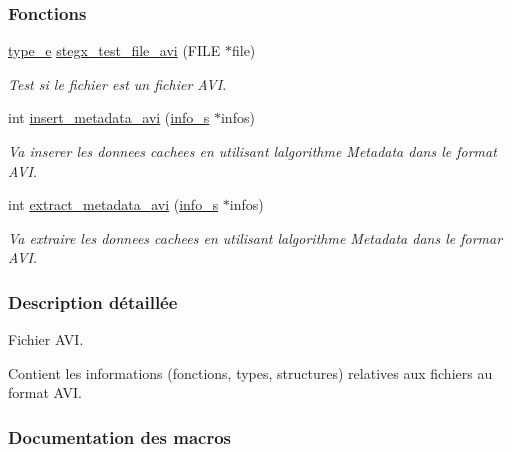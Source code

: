 \subsubsection*{Fonctions}
\begin{DoxyCompactItemize}
\item 
\hyperlink{a00047_af1ca434cca36ba9fb2a45f6cef3a16d6}{type\+\_\+e} \hyperlink{a00068_a219859c3514ef04eb40cb27845b208b0}{stegx\+\_\+test\+\_\+file\+\_\+avi} (F\+I\+LE $\ast$file)
\begin{DoxyCompactList}\small\item\em Test si le fichier est un fichier A\+VI. \end{DoxyCompactList}\item 
int \hyperlink{a00068_ac4b663dd386f05a601c55cd34b99cca4}{insert\+\_\+metadata\+\_\+avi} (\hyperlink{a00008_aa8ca908d92fb5bdd3c0a9e1f58b2cf03}{info\+\_\+s} $\ast$infos)
\begin{DoxyCompactList}\small\item\em Va inserer les donnees cachees en utilisant l\textquotesingle{}algorithme Metadata dans le format A\+VI. \end{DoxyCompactList}\item 
int \hyperlink{a00068_aa0a2b469d42533228d073a79868e775b}{extract\+\_\+metadata\+\_\+avi} (\hyperlink{a00008_aa8ca908d92fb5bdd3c0a9e1f58b2cf03}{info\+\_\+s} $\ast$infos)
\begin{DoxyCompactList}\small\item\em Va extraire les donnees cachees en utilisant l\textquotesingle{}algorithme Metadata dans le formar A\+VI. \end{DoxyCompactList}\end{DoxyCompactItemize}


\subsubsection{Description détaillée}
Fichier A\+VI. 

Contient les informations (fonctions, types, structures) relatives aux fichiers au format A\+VI. 

\subsubsection{Documentation des macros}
\mbox{\label{a00068_a693de8f6e59a0d12f482e5bd560af4e6}} 
